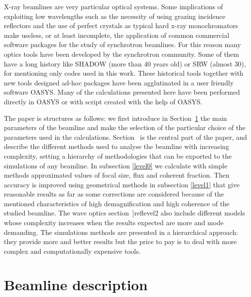 \documentclass{iucr}              %
\begin{document}
X-ray beamlines are very particular optical systems. Some implications of exploiting low wavelengths such as the necessity of using grazing incidence reflectors and the use of perfect crystals as typical hard x-ray monochromators make useless, or at least incomplete, the application of common commercial software packages for the study of synchrotron beamlines. For this reason many optics tools have been developed by the synchrotron community. Some of them have a long history like SHADOW (more than 40 years old) or SRW (almost 30), for mentioning only codes used in this work. These historical tools together with new tools designed ad-hoc packages have been agglutinated in a user friendly software OASYS. Many of the calculations presented here have been performed directly in OASYS or with script created with the help of OASYS. 


The paper is structures as follows: we first introduce in Section~\ref{Beamline description} the main parameters of the beamline and make the selection of the particular choice of the parameters used in the calculations. Section~\label{Simulations} is the central part of the paper, and describe the different methods used to analyse the beamline with increasing complexity, setting a hierarchy of methodologies that can be exported to the simulations of any beamline. In subsection \ref{level0} we calculate with simple methods approximated values of focal size, flux and coherent fraction. Then accuracy is improved using geometrical methods in subsection \ref{level1} that give reasonable results as far as some corrections are considered because of the  mentioned characteristics of high demagnification and high coherence of the studied beamline. The wave optics section~]ref{level2} also include different models whose complexity increases when the results expected are more and mode demanding. The simulations methods are presented in a hierarchical approach:  they provide more and better results but the price to pay is to deal with more complex and computationally expensive tools. 


\section{Beamline description}
\label{Beamline description}
\end{document}
